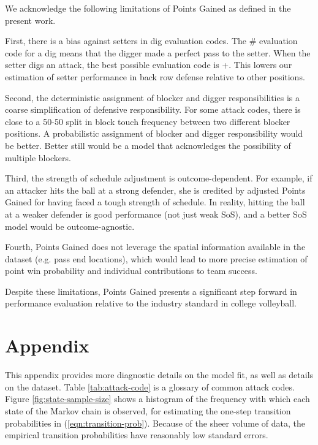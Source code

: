 \documentclass[USenglish]{article}
\theoremstyle{dgthm}
\theoremstyle{dgdef}
\begin{document}
We acknowledge the following limitations of Points Gained as defined in the present work.

First, there is a bias against setters in dig evaluation codes. The \# evaluation code for a dig means that the digger made a perfect pass to the setter. When the setter digs an attack, the best possible evaluation code is +. This lowers our estimation of setter performance in back row defense relative to other positions.

Second, the deterministic assignment of blocker and digger responsibilities is a coarse simplification of defensive responsibility. For some attack codes, there is close to a 50-50 split in block touch frequency between two different blocker positions. A probabilistic assignment of blocker and digger responsibility would be better. Better still would be a model that acknowledges the possibility of multiple blockers.

Third, the strength of schedule adjustment is outcome-dependent. For example, if an attacker hits the ball at a strong defender, she is credited by adjusted Points Gained for having faced a tough strength of schedule. In reality, hitting the ball at a weaker defender is good performance (not just weak SoS), and a better SoS model would be outcome-agnostic.

Fourth, Points Gained does not leverage the spatial information available in the dataset (e.g. pass end locations), which would lead to more precise estimation of point win probability and individual contributions to team success.

Despite these limitations, Points Gained presents a significant step forward in performance evaluation relative to the industry standard in college volleyball.

\printbibliography

\newpage

\section{Appendix}

This appendix provides more diagnostic details on the model fit, as well as details on the dataset. Table \ref{tab:attack-code} is a glossary of common attack codes. Figure \ref{fig:state-sample-size} shows a histogram of the frequency with which each state of the Markov chain is observed, for estimating the one-step transition probabilities in (\ref{eqn:transition-prob}). Because of the sheer volume of data, the empirical transition probabilities have reasonably low standard errors.
\end{document}
